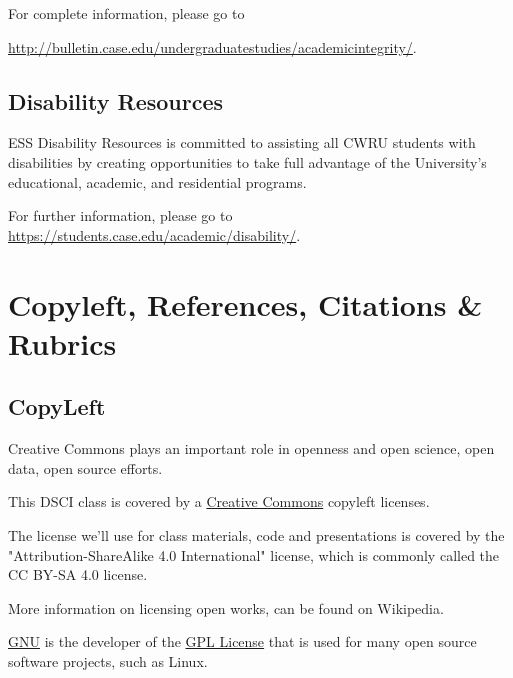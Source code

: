 \documentclass[11pt]{article} %
\begin{document}
    For complete information, please go to
    
     \href{"http://bulletin.case.edu/undergraduatestudies/academicintegrity/"}{http://bulletin.case.edu/undergraduatestudies/academicintegrity/}. 
  
  \subsection{Disability Resources}
  
    ESS Disability Resources is committed to assisting all CWRU students with disabilities by creating opportunities to take full advantage of the University's educational, academic, and residential programs.  
    
    For further information, please go to \href{"https://students.case.edu/academic/disability/''}{https://students.case.edu/academic/disability/}. 

\section{Copyleft, References, Citations  \& Rubrics}


  \subsection{CopyLeft}
  
    Creative Commons plays an important role in openness and open science, open data, open source efforts.  
    
    This DSCI class \cite{french_dsci351-4511:_2015} is covered by a \href{"http://creativecommons.org/licenses/"}{Creative Commons}  \cite{commons_creative_2014} copyleft licenses.  
    
    The license we'll use for class materials, code and presentations is covered by  the "Attribution-ShareAlike 4.0 International" license, which is commonly called the CC BY-SA 4.0 license. \cite{_creative_2015}
       
    More information on licensing open works, can be found on Wikipedia. \cite{commons_creative_2014-1}
    
    \href{"http://www.gnu.org/copyleft/gpl.html"}{GNU} \cite{gnu_gnu.org_2014} is the developer of the \href{"http://en.wikipedia.org/wiki/GNU_General_Public_License"}{GPL License} \cite{gpl_gnu_2014}  that is used for many open source software projects, such as Linux.  
  
\end{document}
